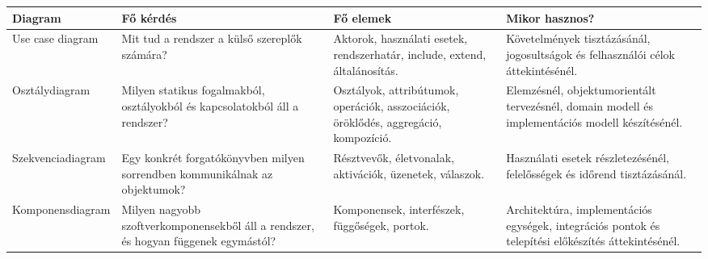 \begin{tabularx}{\textwidth}{L{28mm}X X X}
\toprule
\textbf{Diagram} & \textbf{Fő kérdés} & \textbf{Fő elemek} & \textbf{Mikor hasznos?} \\
\midrule
Use case diagram & Mit tud a rendszer a külső szereplők számára? & Aktorok, használati esetek, rendszerhatár, include, extend, általánosítás. & Követelmények tisztázásánál, jogosultságok és felhasználói célok áttekintésénél. \\
Osztálydiagram & Milyen statikus fogalmakból, osztályokból és kapcsolatokból áll a rendszer? & Osztályok, attribútumok, operációk, asszociációk, öröklődés, aggregáció, kompozíció. & Elemzésnél, objektumorientált tervezésnél, domain modell és implementációs modell készítésénél. \\
Szekvenciadiagram & Egy konkrét forgatókönyvben milyen sorrendben kommunikálnak az objektumok? & Résztvevők, életvonalak, aktivációk, üzenetek, válaszok. & Használati esetek részletezésénél, felelősségek és időrend tisztázásánál. \\
Komponensdiagram & Milyen nagyobb szoftverkomponensekből áll a rendszer, és hogyan függenek egymástól? & Komponensek, interfészek, függőségek, portok. & Architektúra, implementációs egységek, integrációs pontok és telepítési előkészítés áttekintésénél. \\
\bottomrule
\end{tabularx}
